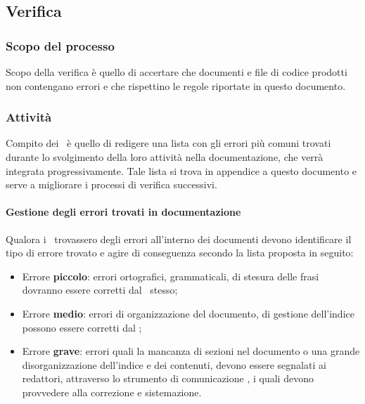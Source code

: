 \documentclass[../NormeDiProgetto.tex]{subfiles}
\begin{document}
		\subsection{Verifica}
			\subsubsection{Scopo del processo}
				Scopo della verifica è quello di accertare che documenti e file di codice prodotti non
				contengano errori e che rispettino le regole riportate in questo documento.
			\subsubsection{Attività}
				Compito dei \verificatori\ è quello di redigere una lista con gli errori più comuni trovati
				durante lo svolgimento della loro attività nella documentazione, che verrà integrata
				progressivamente. Tale lista si trova in appendice a questo documento e serve a
				migliorare i processi di verifica successivi.
				\paragraph{Gestione degli errori trovati in documentazione\\}
					Qualora i \verificatori\ trovassero degli errori all'interno dei documenti devono
					identificare il tipo di errore trovato e agire di conseguenza
					secondo la lista proposta in seguito:
					\begin{itemize}
						\item Errore \textbf{piccolo}: errori ortografici, grammaticali, di stesura delle
						frasi dovranno essere corretti dal \verificatore\ stesso;
						\item Errore \textbf{medio}: errori di organizzazione del documento, di gestione
						dell'indice possono essere corretti dal \verificatore;
						\item Errore \textbf{grave}: errori quali la mancanza di sezioni nel documento o una
						grande disorganizzazione dell'indice e dei contenuti, devono essere segnalati ai
						redattori, attraverso lo strumento di comunicazione , i quali devono
						provvedere alla correzione e sistemazione.
					\end{itemize}
\end{document}
